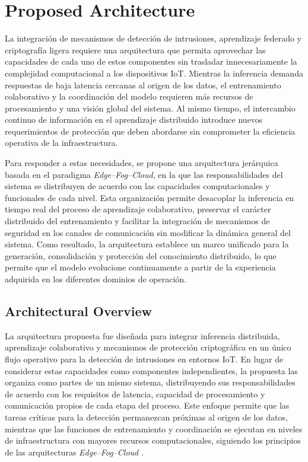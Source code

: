 \documentclass[journal,article,submit,moreauthors]{Definitions/mdpi}
\begin{document}
\section{Proposed Architecture}
\label{sec:architecture}

La integración de mecanismos de detección de intrusiones, aprendizaje federado y criptografía ligera requiere una arquitectura que permita aprovechar las capacidades de cada uno de estos componentes sin trasladar innecesariamente la complejidad computacional a los dispositivos IoT. Mientras la inferencia demanda respuestas de baja latencia cercanas al origen de los datos, el entrenamiento colaborativo y la coordinación del modelo requieren más recursos de procesamiento y una visión global del sistema. Al mismo tiempo, el intercambio continuo de información en el aprendizaje distribuido introduce nuevos requerimientos de protección que deben abordarse sin comprometer la eficiencia operativa de la infraestructura.

Para responder a estas necesidades, se propone una arquitectura jerárquica basada en el paradigma \textit{Edge--Fog--Cloud}, en la que las responsabilidades del sistema se distribuyen de acuerdo con las capacidades computacionales y funcionales de cada nivel. Esta organización permite desacoplar la inferencia en tiempo real del proceso de aprendizaje colaborativo, preservar el carácter distribuido del entrenamiento y facilitar la integración de mecanismos de seguridad en los canales de comunicación sin modificar la dinámica general del sistema. Como resultado, la arquitectura establece un marco unificado para la generación, consolidación y protección del conocimiento distribuido, lo que permite que el modelo evolucione continuamente a partir de la experiencia adquirida en los diferentes dominios de operación.

\subsection{Architectural Overview}
La arquitectura propuesta fue diseñada para integrar inferencia distribuida, aprendizaje colaborativo y mecanismos de protección criptográfica en un único flujo operativo para la detección de intrusiones en entornos IoT. En lugar de considerar estas capacidades como componentes independientes, la propuesta las organiza como partes de un mismo sistema, distribuyendo sus responsabilidades de acuerdo con los requisitos de latencia, capacidad de procesamiento y comunicación propios de cada etapa del proceso. Este enfoque permite que las tareas críticas para la detección permanezcan próximas al origen de los datos, mientras que las funciones de entrenamiento y coordinación se ejecutan en niveles de infraestructura con mayores recursos computacionales, siguiendo los principios de las arquitecturas \textit{Edge--Fog--Cloud} \cite{SaravanaBalaji2023,Wang2019,Ficco2024}.
\end{document}
